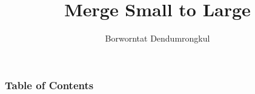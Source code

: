 \documentclass{beamer}
\title[Merge Small to Large] %
{Merge Small to Large}
\author[Borworntat Dendumrongkul] %
{Borworntat Dendumrongkul}
\institute[IOITTT] %
{
  IOI Thailand Task Team
}
\date{}
\begin{document}
\frame{\titlepage}

\begin{frame}
\frametitle{Table of Contents}
\tableofcontents
\end{frame}

% 
% 




\end{document}
